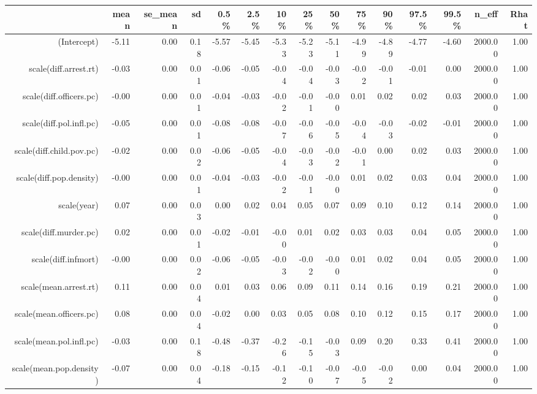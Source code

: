 \begin{table}[ht]
\centering
\begin{tabular}{rrrrrrrrrrrrrrr}
  \hline
 & mean & se\_mean & sd & 0.5\% & 2.5\% & 10\% & 25\% & 50\% & 75\% & 90\% & 97.5\% & 99.5\% & n\_eff & Rhat \\ 
  \hline
(Intercept) & -5.11 & 0.00 & 0.18 & -5.57 & -5.45 & -5.33 & -5.23 & -5.11 & -4.99 & -4.89 & -4.77 & -4.60 & 2000.00 & 1.00 \\ 
  scale(diff.arrest.rt) & -0.03 & 0.00 & 0.01 & -0.06 & -0.05 & -0.04 & -0.04 & -0.03 & -0.02 & -0.01 & -0.01 & 0.00 & 2000.00 & 1.00 \\ 
  scale(diff.officers.pc) & -0.00 & 0.00 & 0.01 & -0.04 & -0.03 & -0.02 & -0.01 & -0.00 & 0.01 & 0.02 & 0.02 & 0.03 & 2000.00 & 1.00 \\ 
  scale(diff.pol.infl.pc) & -0.05 & 0.00 & 0.01 & -0.08 & -0.08 & -0.07 & -0.06 & -0.05 & -0.04 & -0.03 & -0.02 & -0.01 & 2000.00 & 1.00 \\ 
  scale(diff.child.pov.pc) & -0.02 & 0.00 & 0.02 & -0.06 & -0.05 & -0.04 & -0.03 & -0.02 & -0.01 & 0.00 & 0.02 & 0.03 & 2000.00 & 1.00 \\ 
  scale(diff.pop.density) & -0.00 & 0.00 & 0.01 & -0.04 & -0.03 & -0.02 & -0.01 & -0.00 & 0.01 & 0.02 & 0.03 & 0.04 & 2000.00 & 1.00 \\ 
  scale(year) & 0.07 & 0.00 & 0.03 & 0.00 & 0.02 & 0.04 & 0.05 & 0.07 & 0.09 & 0.10 & 0.12 & 0.14 & 2000.00 & 1.00 \\ 
  scale(diff.murder.pc) & 0.02 & 0.00 & 0.01 & -0.02 & -0.01 & -0.00 & 0.01 & 0.02 & 0.03 & 0.03 & 0.04 & 0.05 & 2000.00 & 1.00 \\ 
  scale(diff.infmort) & -0.00 & 0.00 & 0.02 & -0.06 & -0.05 & -0.03 & -0.02 & -0.00 & 0.01 & 0.02 & 0.04 & 0.05 & 2000.00 & 1.00 \\ 
  scale(mean.arrest.rt) & 0.11 & 0.00 & 0.04 & 0.01 & 0.03 & 0.06 & 0.09 & 0.11 & 0.14 & 0.16 & 0.19 & 0.21 & 2000.00 & 1.00 \\ 
  scale(mean.officers.pc) & 0.08 & 0.00 & 0.04 & -0.02 & 0.00 & 0.03 & 0.05 & 0.08 & 0.10 & 0.12 & 0.15 & 0.17 & 2000.00 & 1.00 \\ 
  scale(mean.pol.infl.pc) & -0.03 & 0.00 & 0.18 & -0.48 & -0.37 & -0.26 & -0.15 & -0.03 & 0.09 & 0.20 & 0.33 & 0.41 & 2000.00 & 1.00 \\ 
  scale(mean.pop.density) & -0.07 & 0.00 & 0.04 & -0.18 & -0.15 & -0.12 & -0.10 & -0.07 & -0.05 & -0.02 & 0.00 & 0.04 & 2000.00 & 1.00 \\ 

\end{tabular}
\end{table}
